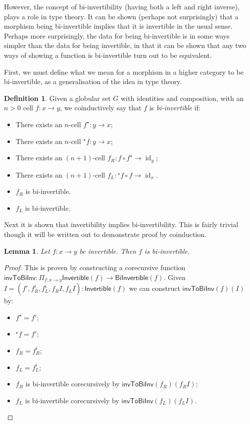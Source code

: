\documentclass{article}
\newtheorem{lemma}{Lemma}
\theoremstyle{definition}
\newtheorem{definition}{Definition}
\theoremstyle{remark}
\DeclareMathOperator{\id}{id}
\newcommand{\linv}[1]{{}^\star\!#1}
\newcommand{\rinv}[1]{#1^\star}
\begin{document}
However, the concept of bi-invertibility (having both a left and right inverse), plays a role in type theory. It can be shown (perhaps not surprisingly) that a morphism being bi-invertible implies that it is invertible in the usual sense. Perhaps more surprisingly, the data for being bi-invertible is in some ways simpler than the data for being invertible, in that it can be shown that any two ways of showing a function is bi-invertible turn out to be equivalent.

First, we must define what we mean for a morphism in a higher category to be bi-invertible, as a generalisation of the idea in type theory.

\begin{definition}
  Given a globular set \(G\) with identities and composition, with an \(n > 0\) cell \(f : x \to y\), we coinductively say that \(f\) is \emph{bi-invertible} if:
  \begin{itemize}
  \item There exists an \(n\)-cell \(\rinv f : y \to x\);
  \item There exists an \(n\)-cell \(\linv f : y \to x\);
  \item There exists an \((n+1)\)-cell \(f_R: f \circ \rinv f \to \id_y\);
  \item There exists an \((n+1)\)-cell \(f_L: \linv f \circ f \to \id_x\).
  \item \(f_R\) is bi-invertible.
  \item \(f_L\) is bi-invertible.
  \end{itemize}
\end{definition}

Next it is shown that invertibility implies bi-invertibility. This is fairly trivial though it will be written out to demonstrate proof by coinduction.

\begin{lemma}\label{lem:inv-to-bi-inv}
  Let \(f : x \to y\) be invertible. Then \(f\) is bi-invertible.
\end{lemma}

\begin{proof}
  This is proven by constructing a corecursive function \(\mathsf{invToBiInv} : \Pi_{f : x \to y} \mathsf{Invertible}(f) \to \mathsf{BiInvertible}(f)\). Given \(I = (f',f_R^i,f_L^i,f_R{}I, f_L{}I) : \mathsf{Invertible}(f)\) we can construct \(\mathsf{invToBiInv}(f)(I)\) by:
  \begin{itemize}
  \item \(\rinv f = f'\);
  \item \(\linv f = f'\);
  \item \(f_R = f_R^i\);
  \item \(f_L = f_L^i\);
  \item \(f_R\) is bi-invertible corecursively by \(\mathsf{invToBiInv}(f_R)(f_R{}I)\);
  \item \(f_L\) is bi-invertible corecursively by \(\mathsf{invToBiInv}(f_L)(f_L{}I)\).
  \end{itemize}
\end{proof}
\end{document}
